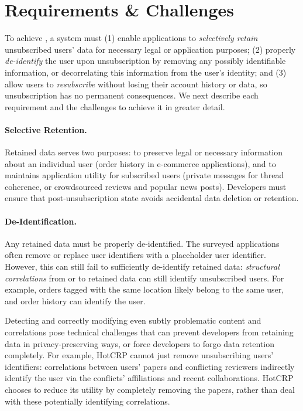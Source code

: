 \section{\name Requirements \& Challenges}

To achieve \name, a system must (1) enable applications to \emph{selectively retain} unsubscribed
users' data for necessary legal or application purposes; (2) properly \emph{de-identify} the user
upon unsubscription by removing any possibly identifiable information, or decorrelating this
information from the user's identity; and (3) allow users to \emph{resubscribe} without losing their
account history or data, so unsubscription has no permanent consequences. We next describe each
requirement and the challenges to achieve it in greater detail.

\paragraph{Selective Retention.}
Retained data serves two purposes: to preserve legal or
necessary information about an individual user (\eg order history in e-commerce applications), and
to maintains application utility for subscribed users (\eg private messages
for thread coherence, or crowdsourced reviews and popular news posts).
Developers must ensure that post-unsubscription state avoids accidental data deletion or retention.

\paragraph{De-Identification.}
Any retained data must be properly de-identified. The surveyed applications often remove or replace
user identifiers with a placeholder user identifier. However, this can still fail to sufficiently
de-identify retained data: \emph{structural correlations} from or to retained data can still identify
unsubscribed users. For example, orders tagged with the same location likely belong to the same
user, and order history can identify the user. 

Detecting and correctly modifying even subtly problematic content and correlations pose technical
challenges that can prevent developers from retaining data in privacy-preserving ways, or force
developers to forgo data retention completely.  For example, HotCRP cannot just remove unsubscribing
users' identifiers: correlations between users' papers and conflicting reviewers indirectly identify
the user via the conflicts' affiliations and recent collaborations.  HotCRP chooses to reduce its
utility by completely removing the papers, rather than deal with these potentially identifying
correlations.

